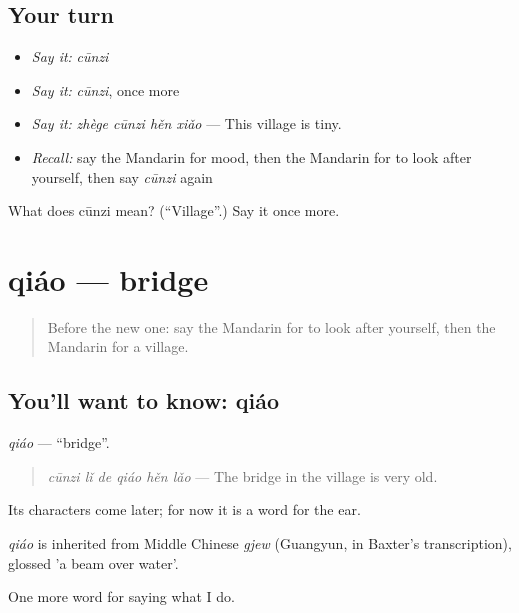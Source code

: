 \subsection*{Your turn}
\begin{itemize}
\raggedright
  \item \emph{Say it:} \emph{cūnzi}
  \item \emph{Say it:} \emph{cūnzi}, once more
  \item \emph{Say it:} \emph{zhège cūnzi hěn xiǎo} — This village is tiny.
  \item \emph{Recall:} say the Mandarin for mood, then the Mandarin for to look after yourself, then say \emph{cūnzi} again
\end{itemize}

\begin{tcolorbox}[breakable,colback=teal!4,colframe=teal!35!black,title={Before you move on}]
What does cūnzi mean? (\textquotedblleft{}Village\textquotedblright{}.) Say it once more.
\end{tcolorbox}
\section[qiáo]{qiáo — bridge}

\label{lesson:ZH-C246-qiao}



\begin{quote}
Before the new one: say the Mandarin for to look after yourself, then the Mandarin for a village.
\end{quote}

\subsection*{You'll want to know: qiáo}
\emph{qiáo} — \textquotedblleft{}bridge\textquotedblright{}.

\begin{quote}
\emph{cūnzi lǐ de qiáo hěn lǎo} — The bridge in the village is very old.
\end{quote}

Its characters come later; for now it is a word for the ear.

\begin{cousinweb}
\emph{qiáo} is inherited from Middle Chinese \emph{gjew} (Guangyun, in Baxter's transcription), glossed 'a beam over water'.
\end{cousinweb}

\begin{grammarlens}[title={What you've built}]
One more word for saying what I do.
\end{grammarlens}

